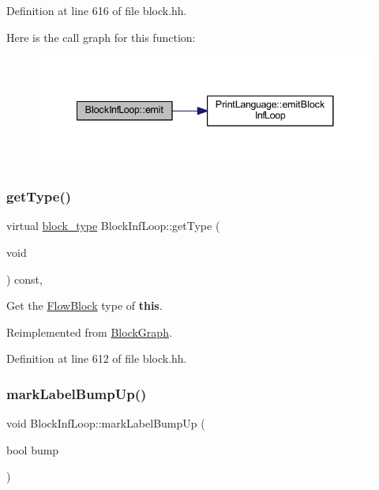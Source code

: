 Definition at line 616 of file block.\+hh.

Here is the call graph for this function\+:
\nopagebreak
\begin{figure}[H]
\begin{center}
\leavevmode
\includegraphics[width=341pt]{class_block_inf_loop_aa86634144acbb9f7b6b580b9f4566bfe_cgraph}
\end{center}
\end{figure}
\mbox{\label{class_block_inf_loop_a798896823e2c790567144b525753eca7}} 
\subsubsection{\texorpdfstring{getType()}{getType()}}
{\footnotesize\ttfamily virtual \mbox{\hyperlink{class_flow_block_a70df78390870fcdd51e31426ba6a193e}{block\+\_\+type}} Block\+Inf\+Loop\+::get\+Type (\begin{DoxyParamCaption}\item[{void}]{ }\end{DoxyParamCaption}) const\hspace{0.3cm}{\ttfamily [inline]}, {\ttfamily [virtual]}}



Get the \mbox{\hyperlink{class_flow_block}{Flow\+Block}} type of {\bfseries{this}}. 



Reimplemented from \mbox{\hyperlink{class_block_graph_a8e542e109e0acc977218ceaf3c248153}{Block\+Graph}}.



Definition at line 612 of file block.\+hh.

\mbox{\label{class_block_inf_loop_a4b07279f936c69240ceacf4d5e8dfebc}} 
\subsubsection{\texorpdfstring{markLabelBumpUp()}{markLabelBumpUp()}}
{\footnotesize\ttfamily void Block\+Inf\+Loop\+::mark\+Label\+Bump\+Up (\begin{DoxyParamCaption}\item[{bool}]{bump }\end{DoxyParamCaption})\hspace{0.3cm}{\ttfamily [virtual]}}




